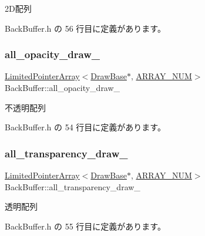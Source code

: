 2\+D配列 



 Back\+Buffer.\+h の 56 行目に定義があります。

\mbox{\label{class_back_buffer_a65bf72418a1ca652ef535a172bc3d7b8}} 
\subsubsection{\texorpdfstring{all\+\_\+opacity\+\_\+draw\+\_\+}{all\_opacity\_draw\_}}
{\footnotesize\ttfamily \mbox{\hyperlink{class_limited_pointer_array}{Limited\+Pointer\+Array}}$<$\mbox{\hyperlink{class_draw_base}{Draw\+Base}}$\ast$, \mbox{\hyperlink{class_back_buffer_a28e89a0c543b6ae579c8ab75f9917059}{A\+R\+R\+A\+Y\+\_\+\+N\+UM}}$>$ Back\+Buffer\+::all\+\_\+opacity\+\_\+draw\+\_\+\hspace{0.3cm}{\ttfamily [private]}}



不透明配列 



 Back\+Buffer.\+h の 54 行目に定義があります。

\mbox{\label{class_back_buffer_a4148d27e959958813e88cc71ebec1a6e}} 
\subsubsection{\texorpdfstring{all\+\_\+transparency\+\_\+draw\+\_\+}{all\_transparency\_draw\_}}
{\footnotesize\ttfamily \mbox{\hyperlink{class_limited_pointer_array}{Limited\+Pointer\+Array}}$<$\mbox{\hyperlink{class_draw_base}{Draw\+Base}}$\ast$, \mbox{\hyperlink{class_back_buffer_a28e89a0c543b6ae579c8ab75f9917059}{A\+R\+R\+A\+Y\+\_\+\+N\+UM}}$>$ Back\+Buffer\+::all\+\_\+transparency\+\_\+draw\+\_\+\hspace{0.3cm}{\ttfamily [private]}}



透明配列 



 Back\+Buffer.\+h の 55 行目に定義があります。

